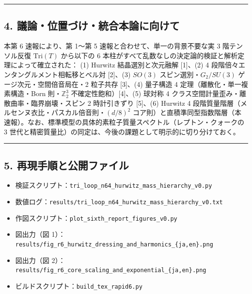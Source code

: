 \documentclass[
  a4paper,
]{ltjsarticle}
\providecommand{\tightlist}{%
  \setlength{\itemsep}{0pt}\setlength{\parskip}{0pt}}
\begin{document}
\begin{center}\rule{0.5\linewidth}{0.5pt}\end{center}

\subsection{4.
議論・位置づけ・統合本論に向けて}\label{ux8b70ux8ad6ux4f4dux7f6eux3065ux3051ux7d71ux5408ux672cux8ad6ux306bux5411ux3051ux3066}

本第 6 速報により、第 1〜第 5 速報と合わせて、単一の背景不要な実 3
階テンソル反復 \(\mathrm{Tri}(T)\) から以下の 6
本柱がすべて乱数なしの決定論的検証と解析定理によって確立された： (1)
Hurwitz 結晶選別と次元融解 {[}1{]}、(2) 4
段階倍々エンタングルメント相転移とベル対 {[}2{]}、(3) \(SO(3)\)
スピン選別・\(G_2/SU(3)\) ゲージ次元・空間倍音局在・2 粒子共存
{[}3{]}、(4) 量子構造 4 定理（離散化・単一複素構造・Born
則・\(\mathbb{Z}_2^3\) 不確定性飽和）{[}4{]}、(5) 球対称 4
クラス空間計量歪み・離散曲率・臨界崩壊・スピン 2 時計引きずり
{[}5{]}、(6) Hurwitz 4
段階質量階層（メルセンヌ衣比・パスカル倍音則・\((d/8)^2\)
コア則）と直積準同型指数階層（本速報）。なお、標準模型の具体的素粒子質量スペクトル（レプトン・クォークの
3 世代と精密質量比）の同定は、今後の課題として明示的に切り分けておく。

\begin{center}\rule{0.5\linewidth}{0.5pt}\end{center}

\subsection{5.
再現手順と公開ファイル}\label{ux518dux73feux624bux9806ux3068ux516cux958bux30d5ux30a1ux30a4ux30eb}

\begin{itemize}
\tightlist
\item
  検証スクリプト：\texttt{tri\_loop\_n64\_hurwitz\_mass\_hierarchy\_v0.py}
\item
  数値ログ：\texttt{results/tri\_loop\_n64\_hurwitz\_mass\_hierarchy\_v0.txt}
\item
  作図スクリプト：\texttt{plot\_sixth\_report\_figures\_v0.py}
\item
  図出力（図
  1）：\texttt{results/fig\_r6\_hurwitz\_dressing\_and\_harmonics\_\{ja,en\}.png}
\item
  図出力（図
  2）：\texttt{results/fig\_r6\_core\_scaling\_and\_exponential\_\{ja,en\}.png}
\item
  ビルドスクリプト：\texttt{build\_tex\_rapid6.py}
\end{itemize}
\end{document}
